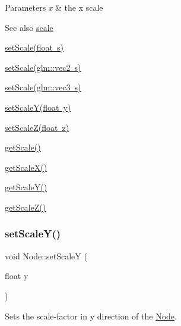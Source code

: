 \begin{DoxyParams}{Parameters}
{\em x} & the x scale \\
\hline
\end{DoxyParams}
\begin{DoxySeeAlso}{See also}
\mbox{\hyperlink{classsage_1_1Node_a686c3edeea1faab8b566bfdf2fe3f906}{scale}} 

\mbox{\hyperlink{classsage_1_1Node_a939698b2eb68ee5b60b91e2426e95369}{set\+Scale(float s)}} 

\mbox{\hyperlink{classsage_1_1Node_aecff30b003ce1c2266cc60a34b72559d}{set\+Scale(glm\+::vec2 s)}} 

\mbox{\hyperlink{classsage_1_1Node_a7481b934a6ef259a14aee4d0b87cb2aa}{set\+Scale(glm\+::vec3 s)}} 

\mbox{\hyperlink{classsage_1_1Node_afa22161545d63e9e011f8eeb5acdead7}{set\+Scale\+Y(float y)}} 

\mbox{\hyperlink{classsage_1_1Node_a5cc4be0b41e5a737cae73fff05e86857}{set\+Scale\+Z(float z)}} 

\mbox{\hyperlink{classsage_1_1Node_ac41e15cac1e23a4c48798291c70dcdd8}{get\+Scale()}} 

\mbox{\hyperlink{classsage_1_1Node_a27040ef8ab59ccf42b87d6ddc8d794e6}{get\+Scale\+X()}} 

\mbox{\hyperlink{classsage_1_1Node_ab87661ab8940512baf2e7639ea55ff87}{get\+Scale\+Y()}} 

\mbox{\hyperlink{classsage_1_1Node_a0b55ddbe04d126953e1db8606d9a9ecd}{get\+Scale\+Z()}} 
\end{DoxySeeAlso}
\mbox{\label{classsage_1_1Node_afa22161545d63e9e011f8eeb5acdead7}} 
\subsubsection{\texorpdfstring{setScaleY()}{setScaleY()}}
{\footnotesize\ttfamily void Node\+::set\+ScaleY (\begin{DoxyParamCaption}\item[{float}]{y }\end{DoxyParamCaption})}



Sets the scale-\/factor in y direction of the \mbox{\hyperlink{classsage_1_1Node}{Node}}. 


